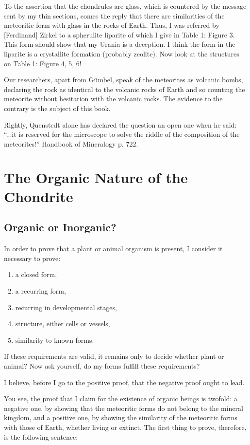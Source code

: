 \documentclass[a4paper, 11pt, oneside]{article}
\begin{document}
To the assertion that the chondrules are glass, which is countered by the message sent by my thin sections, comes the reply that there are similarities of the meteoritic form with glass in the rocks of Earth. Thus, I was referred by [Ferdinand] Zirkel to a spherulite liparite of which I give in Table 1: Figure 3. This form should show that my Urania is a deception. I think the form in the liparite is a crystallite formation (probably zeolite). Now look at the structures on Table 1: Figure 4, 5, 6!

Our researchers, apart from Gümbel, speak of the meteorites as volcanic bombs, declaring the rock as identical to the volcanic rocks of Earth and so counting the meteorite without hesitation with the volcanic rocks. The evidence to the contrary is the subject of this book.

Rightly, Quenstedt alone has declared the question an open one when he said: ``...it is reserved for the microscope to solve the riddle of the composition of the meteorites!'' Handbook of Mineralogy p. 722.
\clearpage
\section{The Organic Nature of the Chondrite}
\subsection{Organic or Inorganic?}
\paragraph{}
In order to prove that a plant or animal organism is present, I consider it necessary to prove:
\begin{enumerate}
    \item a closed form,
    \item a recurring form,
    \item recurring in developmental stages,
    \item structure, either cells or vessels,
    \item similarity to known forms.
\end{enumerate}
If these requirements are valid, it remains only to decide whether plant or animal? Now ask yourself, do my forms fulfill these requirements?

I believe, before I go to the positive proof, that the negative proof ought to lead.

You see, the proof that I claim for the existence of organic beings is twofold: a negative one, by showing that the meteoritic forms do not belong to the mineral kingdom, and a positive one, by showing the similarity of the meteoritic forms with those of Earth, whether living or extinct. The first thing to prove, therefore, is the following sentence:
\end{document}
